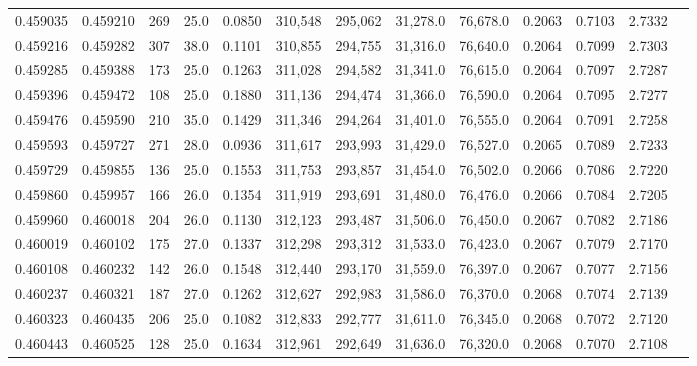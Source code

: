 \begin{tabular}{rrrrrrrrrrrrr}
0.459035 & 0.459210 &   269 & 25.0 &                                     0.0850 & 310,548 & 295,062 &  31,278.0 &  76,678.0 & 0.2063 & 0.7103 & 2.7332 \\
0.459216 & 0.459282 &   307 & 38.0 &                                     0.1101 & 310,855 & 294,755 &  31,316.0 &  76,640.0 & 0.2064 & 0.7099 & 2.7303 \\
0.459285 & 0.459388 &   173 & 25.0 &                                     0.1263 & 311,028 & 294,582 &  31,341.0 &  76,615.0 & 0.2064 & 0.7097 & 2.7287 \\
0.459396 & 0.459472 &   108 & 25.0 &                                     0.1880 & 311,136 & 294,474 &  31,366.0 &  76,590.0 & 0.2064 & 0.7095 & 2.7277 \\
0.459476 & 0.459590 &   210 & 35.0 &                                     0.1429 & 311,346 & 294,264 &  31,401.0 &  76,555.0 & 0.2064 & 0.7091 & 2.7258 \\
0.459593 & 0.459727 &   271 & 28.0 &                                     0.0936 & 311,617 & 293,993 &  31,429.0 &  76,527.0 & 0.2065 & 0.7089 & 2.7233 \\
0.459729 & 0.459855 &   136 & 25.0 &                                     0.1553 & 311,753 & 293,857 &  31,454.0 &  76,502.0 & 0.2066 & 0.7086 & 2.7220 \\
0.459860 & 0.459957 &   166 & 26.0 &                                     0.1354 & 311,919 & 293,691 &  31,480.0 &  76,476.0 & 0.2066 & 0.7084 & 2.7205 \\
0.459960 & 0.460018 &   204 & 26.0 &                                     0.1130 & 312,123 & 293,487 &  31,506.0 &  76,450.0 & 0.2067 & 0.7082 & 2.7186 \\
0.460019 & 0.460102 &   175 & 27.0 &                                     0.1337 & 312,298 & 293,312 &  31,533.0 &  76,423.0 & 0.2067 & 0.7079 & 2.7170 \\
0.460108 & 0.460232 &   142 & 26.0 &                                     0.1548 & 312,440 & 293,170 &  31,559.0 &  76,397.0 & 0.2067 & 0.7077 & 2.7156 \\
0.460237 & 0.460321 &   187 & 27.0 &                                     0.1262 & 312,627 & 292,983 &  31,586.0 &  76,370.0 & 0.2068 & 0.7074 & 2.7139 \\
0.460323 & 0.460435 &   206 & 25.0 &                                     0.1082 & 312,833 & 292,777 &  31,611.0 &  76,345.0 & 0.2068 & 0.7072 & 2.7120 \\
0.460443 & 0.460525 &   128 & 25.0 &                                     0.1634 & 312,961 & 292,649 &  31,636.0 &  76,320.0 & 0.2068 & 0.7070 & 2.7108 \\

\end{tabular}

